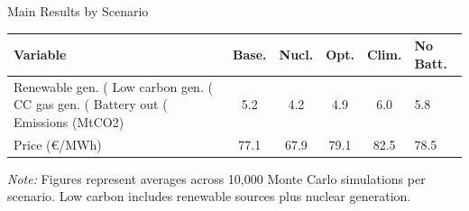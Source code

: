 \begin{center}
    \vspace{-0.25cm}
    \captionsetup{type=table}
    \caption{Main Results by Scenario}
    \label{tab:main_results}
    \small 
    \begin{tabular}{lcccc}
        \toprule
        \textbf{Variable} & 
        \textbf{Base.} & 
        \textbf{Nucl.} & 
        \textbf{Opt.} & 
        \textbf{Clim.} & 
        \textbf{No Batt.} \\
        \midrule
        Renewable gen. (%
        Low carbon gen. (%
        CC gas gen. (%
        Battery out (%
        Emissions (MtCO2) & 5.2 & 4.2 & 4.9 & 6.0 & 5.8 \\
        Price (€/MWh) & 77.1 & 67.9 & 79.1 & 82.5 & 78.5 \\
        \bottomrule
    \end{tabular}
    \vspace{-0.25cm}
    \caption*{\footnotesize \textit{Note:} Figures represent averages across 10,000 Monte Carlo simulations per scenario. Low carbon includes renewable sources plus nuclear generation.}
\end{center}